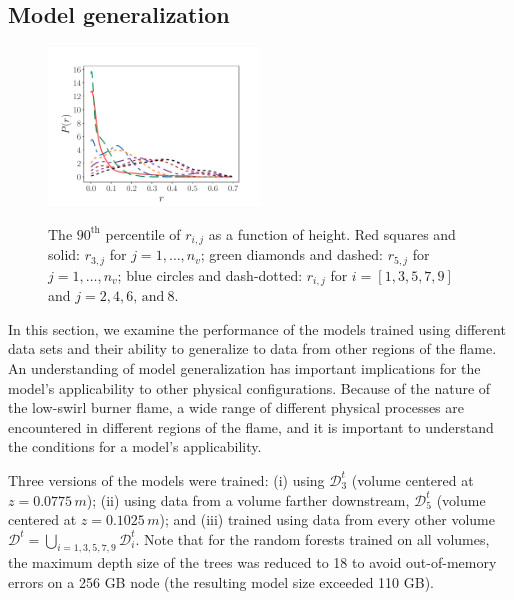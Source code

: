 \documentclass[review]{elsarticle}
\begin{document}
\subsection{Model generalization}\label{sec:predictions_all}

\begin{figure}[!tbp]%
  \centering%
  \includegraphics[page=4,width=0.5\textwidth]{./figs/pdf_distances.pdf}\\%
  \caption{The $90^{\text{th}}$ percentile of $r_{i,j}$ as a function
    of height. Red squares and solid: $r_{3,j}$ for $j=1,\dots,n_v$;
    green diamonds and dashed: $r_{5,j}$ for $j=1,\dots,n_v$; blue
    circles and dash-dotted: $r_{i,j}$ for $i=[1,3,5,7,9]$ and
    $j=2,4,6,\,\text{and}\ 8$.}\label{fig:r90}%
\end{figure}%

In this section, we examine the performance of the models trained
using different data sets and their ability to generalize to data from
other regions of the flame. An understanding of model generalization
has important implications for the model's applicability to other
physical configurations. Because of the nature of the low-swirl burner
flame, a wide range of different physical processes are encountered in
different regions of the flame, and it is important to understand the
conditions for a model's applicability.

Three versions of the models were trained: (i) using $\mathcal{D}_3^t$
(volume centered at $z=0.0775\,\unit{m}$); (ii) using data from a volume
farther downstream, $\mathcal{D}_5^t$ (volume centered at
$z=0.1025\,\unit{m}$); and (iii) trained using data from every other
volume
$\mathcal{D}^t = \bigcup\limits_{i=1, 3, 5, 7, 9} \mathcal{D}_i^t$.
Note that for the random forests trained on all volumes, the maximum depth size
of the trees was reduced to 18 to avoid out-of-memory errors
on a 256 GB node (the resulting model size exceeded 110 GB).
\end{document}
